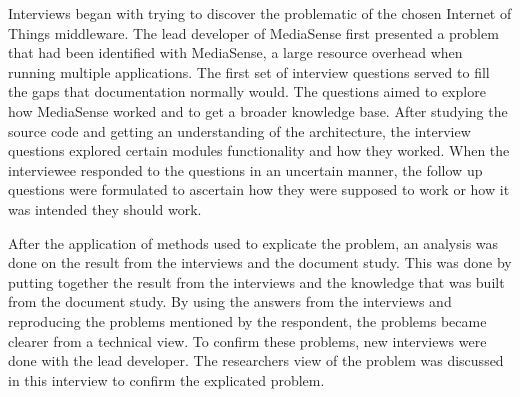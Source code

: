Interviews began with trying to discover the problematic of the chosen Internet of Things middleware. The lead developer of MediaSense first presented a problem that had been identified with MediaSense, a large resource overhead when running multiple applications. The first set of interview questions served to fill the gaps that documentation normally would. The questions aimed to explore how MediaSense worked and to get a broader knowledge base. After studying the source code and getting an understanding of the architecture, the interview questions explored certain modules functionality and how they worked. When the interviewee responded to the questions in an uncertain manner, the follow up questions were formulated to ascertain how they were supposed to work or how it was intended they should work.

After the application of methods used to explicate the problem, an analysis was done on the result from the interviews and the document study. This was done by putting together the result from the interviews and the knowledge that was built from the document study. By using the answers from the interviews and reproducing the problems mentioned by the respondent, the problems became clearer from a technical view. To confirm these problems, new interviews were done with the lead developer. The researchers view of the problem was discussed in this interview to confirm the explicated problem.
